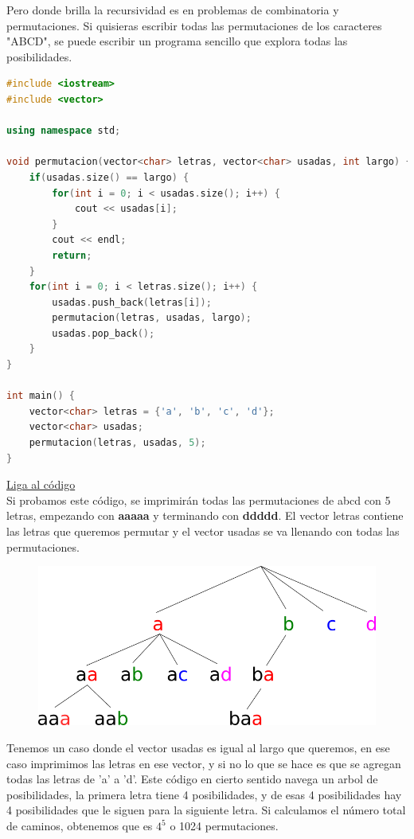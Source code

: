 \documentclass{article}
\begin{document}
Pero donde brilla la recursividad es en problemas de combinatoria y permutaciones. Si quisieras escribir todas las permutaciones de los caracteres "ABCD", se puede escribir un programa sencillo que explora todas las posibilidades.

\begin{lstlisting}[language=C++, caption=Permutaciones]
#include <iostream>
#include <vector>

using namespace std;

void permutacion(vector<char> letras, vector<char> usadas, int largo) {
    if(usadas.size() == largo) {
        for(int i = 0; i < usadas.size(); i++) {
            cout << usadas[i];
        }
        cout << endl;
        return;
    }
    for(int i = 0; i < letras.size(); i++) {
        usadas.push_back(letras[i]);
        permutacion(letras, usadas, largo);
        usadas.pop_back();
    }
}

int main() {
    vector<char> letras = {'a', 'b', 'c', 'd'};
    vector<char> usadas;
    permutacion(letras, usadas, 5);
}
\end{lstlisting}
\href{https://repl.it/@Jamesscn/Permutando}{Liga al código} \\

Si probamos este código, se imprimirán todas las permutaciones de abcd con 5 letras, empezando con \textbf{aaaaa} y terminando con \textbf{ddddd}. El vector letras contiene las letras que queremos permutar y el vector usadas se va llenando con todas las permutaciones.

\begin{figure}[H]
    \centering
    \includegraphics[width=0.3\paperwidth]{permutacion}
\end{figure}

Tenemos un caso donde el vector usadas es igual al largo que queremos, en ese caso imprimimos las letras en ese vector, y si no lo que se hace es que se agregan todas las letras de 'a' a 'd'. Este código en cierto sentido navega un arbol de posibilidades, la primera letra tiene 4 posibilidades, y de esas 4 posibilidades hay 4 posibilidades que le siguen para la siguiente letra. Si calculamos el número total de caminos, obtenemos que es $4^5$ o 1024 permutaciones.
\end{document}
